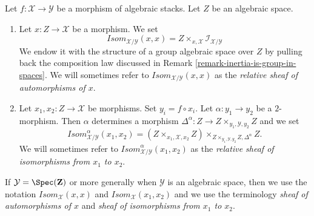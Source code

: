 \begin{definition}
\label{definition-isom}
Let $f : \mathcal{X} \to \mathcal{Y}$ be a morphism of algebraic stacks.
Let $Z$ be an algebraic space.
\begin{enumerate}
\item Let $x : Z \to \mathcal{X}$ be a morphism. We set
$$
\mathit{Isom}_{\mathcal{X}/\mathcal{Y}}(x, x) =
Z \times_{x, \mathcal{X}} \mathcal{I}_{\mathcal{X}/\mathcal{Y}}
$$
We endow it with the structure of a group algebraic space over $Z$
by pulling back the composition law discussed in
Remark \ref{remark-inertia-is-group-in-spaces}.
We will sometimes refer to $\mathit{Isom}_{\mathcal{X}/\mathcal{Y}}(x, x)$
as the {\it relative sheaf of automorphisms of $x$}.
\item Let $x_1, x_2 : Z \to \mathcal{X}$ be morphisms. Set
$y_i = f \circ x_i$. Let $\alpha : y_1 \to y_2$ be a $2$-morphism.
Then $\alpha$ determines a morphism
$\Delta^\alpha : Z \to Z \times_{y_1, \mathcal{Y}, y_2} Z$ and we set
$$
\mathit{Isom}_{\mathcal{X}/\mathcal{Y}}^\alpha(x_1, x_2) =
(Z \times_{x_1, \mathcal{X}, x_2} Z)
\times_{Z \times_{y_1, \mathcal{Y}, y_2} Z, \Delta^\alpha} Z.
$$
We will sometimes refer to
$\mathit{Isom}_{\mathcal{X}/\mathcal{Y}}^\alpha(x_1, x_2)$
as the {\it relative sheaf of isomorphisms from $x_1$ to $x_2$}.
\end{enumerate}
If $\mathcal{Y} = \Spec(\mathbf{Z})$ or more generally when $\mathcal{Y}$
is an algebraic space, then we use the notation
$\mathit{Isom}_\mathcal{X}(x, x)$ and $\mathit{Isom}_\mathcal{X}(x_1, x_2)$
and we use the terminology {\it sheaf of automorphisms of $x$}
and {\it sheaf of isomorphisms from $x_1$ to $x_2$}.
\end{definition}

